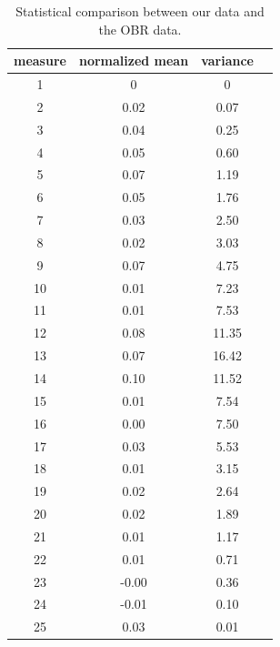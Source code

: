 \begin{table}[h]
\centering
 \begin{tabular}{c|c|c|c}
    measure & normalized mean & variance \\
    \hline
		1 &    0     &  0    \\
		2 &    0.02  &  0.07 \\
		3 &    0.04  &  0.25 \\
		4 &    0.05  &  0.60 \\
		5 &    0.07  &  1.19 \\
		6 &    0.05  &  1.76 \\
		7 &    0.03  &  2.50 \\
		8 &    0.02  &  3.03 \\
		9 &    0.07  &  4.75 \\
		10 &   0.01  &  7.23 \\
		11 &   0.01  &  7.53 \\
		12 &   0.08  & 11.35 \\
		13 &   0.07  & 16.42 \\
		14 &   0.10  & 11.52 \\
		15 &   0.01  &  7.54 \\
		16 &   0.00  &  7.50 \\
		17 &   0.03  &  5.53 \\
		18 &   0.01  &  3.15 \\
		19 &   0.02  &  2.64 \\
		20 &   0.02  &  1.89 \\
		21 &   0.01  &  1.17 \\
		22 &   0.01  &  0.71 \\
		23 &  -0.00  &  0.36 \\
		24 &  -0.01  &  0.10 \\
		25 &   0.03  &  0.01 \\
 \end{tabular}
\caption{Statistical comparison between our data and the OBR data.}
 \label{table:difference}
\end{table}
